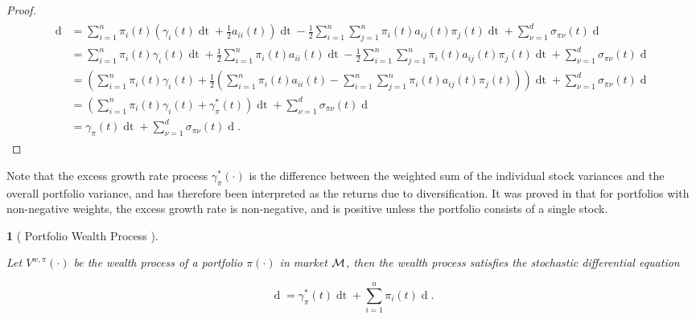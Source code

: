 \documentclass[british]{amsart} \usepackage{lmodern}
\numberwithin{equation}{section} \numberwithin{figure}{section}
\theoremstyle{plain} \newtheorem{thm}{\protect\theoremname}[section]
\theoremstyle{definition} \newtheorem{defn}[thm]{\protect\definitionname}
\theoremstyle{plain} \newtheorem{assumption}[thm]{\protect\assumptionname}
\theoremstyle{plain} \newtheorem{lem}[thm]{\protect\lemmaname}
\theoremstyle{plain} \newtheorem{prop}[thm]{\protect\propositionname}
\theoremstyle{remark} \newtheorem{rem}[thm]{\protect\remarkname}
\theoremstyle{plain} \newtheorem{cor}[thm]{\protect\corollaryname}
\renewcommand{\d}[1]{\mathop{\mathrm{d}{#1}}}
\newcommand{\V}{V^{w,\pi}}
\begin{document}
\begin{proof}
  \begin{gather*}
    \begin{split}
      \d{\log{\V(t)}} 
        & =
            \sum_{i=1}^{n} \pi_{i}(t) \left( 
                \gamma_{i}(t)\d{t} + \frac{1}{2}a_{ii}(t) 
            \right)\d{t}
           - \frac{1}{2} \sum_{i=1}^{n} \sum_{j=1}^{n} \pi_{i}(t)a_{ij}(t)\pi_{j}(t)\d{t}
          + \sum_{\nu=1}^{d} \sigma_{\pi\nu}(t) \d{W_{\nu}(t)} \\
        & =
            \sum_{i=1}^{n} \pi_{i}(t)\gamma_{i}(t)\d{t} +
                \frac{1}{2} \sum_{i=1}^{n} \pi_{i}(t)a_{ii}(t) \d{t}
                - \frac{1}{2} \sum_{i=1}^{n} \sum_{j=1}^{n} \pi_{i}(t)a_{ij}(t)\pi_{j}(t)\d{t}
          + \sum_{\nu=1}^{d} \sigma_{\pi\nu}(t) \d{W_{\nu}(t)} \\
         & =
          \left(
            \sum_{i=1}^{n} \pi_{i}(t)\gamma_{i}(t) +
            \frac{1}{2}
              \left(
                \sum_{i=1}^{n} \pi_{i}(t)a_{ii}(t) -
                \sum_{i=1}^{n} \sum_{j=1}^{n} \pi_{i}(t)a_{ij}(t)\pi_{j}(t)
              \right) 
          \right)\d{t} +
          \sum_{\nu=1}^{d} \sigma_{\pi\nu}(t) \d{W_{\nu}(t)} \\
         & =
          \left(
            \sum_{i=1}^{n} \pi_{i}(t)\gamma_{i}(t) +
            \gamma_{\pi}^{*}(t)
          \right)\d{t} +
          \sum_{\nu=1}^{d} \sigma_{\pi\nu}(t) \d{W_{\nu}(t)} \\
         &=
          \gamma_{\pi}(t) \d{t} +
          \sum_{\nu=1}^{d} \sigma_{\pi\nu}(t) \d{W_{\nu}(t)}.
   \end{split}
  \end{gather*}

\end{proof}

Note that the excess growth rate process $\gamma_{\pi}^{*}(\cdot)$ is the
difference between the weighted sum of the individual stock variances and the
overall portfolio variance, and has therefore been interpreted as the returns due
to diversification. It was proved in \cite{fernholz1999diversity} that for
portfolios with non-negative weights, the excess growth rate is non-negative,
and is positive unless the portfolio consists of a single stock.

\begin{prop} 
  [
    {\cite[Equation 1.15]{fernholz2009}}
    Portfolio Wealth Process
  ]
  \label{prop:dlogV}

  Let $\V(\cdot)$ be the wealth process of a portfolio $\pi(\cdot)$ in market
  $\mathcal{M}$, then the wealth process satisfies the stochastic differential equation

  \begin{equation}
      \d{\log \V(t)} = \gamma_{\pi}^{*}(t)\d{t} + \sum_{i=1}^{n} \pi_{i}(t) \d{\log{X_{i}(t)}}.
  \end{equation}

\end{prop}
\end{document}
